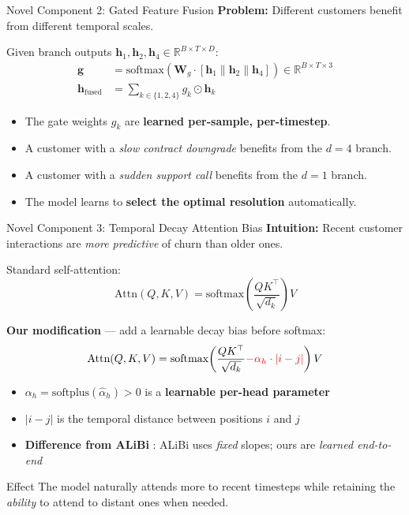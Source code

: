 \documentclass[aspectratio=169,11pt]{beamer}
\begin{document}
\begin{frame}{Novel Component 2: Gated Feature Fusion}
\textbf{Problem:} Different customers benefit from different temporal scales.
\vspace{6pt}

Given branch outputs $\mathbf{h}_1, \mathbf{h}_2, \mathbf{h}_4 \in \mathbb{R}^{B \times T \times D}$:
\vspace{4pt}
\begin{align}
    \mathbf{g} &= \text{softmax}\!\left(\mathbf{W}_g \cdot [\mathbf{h}_1 \| \mathbf{h}_2 \| \mathbf{h}_4]\right) \in \mathbb{R}^{B \times T \times 3} \\[4pt]
    \mathbf{h}_{\text{fused}} &= \sum_{k \in \{1,2,4\}} g_k \odot \mathbf{h}_k
\end{align}
\vspace{4pt}
\begin{itemize}
    \item The gate weights $g_k$ are \textbf{learned per-sample, per-timestep}.
    \item A customer with a \textit{slow contract downgrade} benefits from the $d{=}4$ branch.
    \item A customer with a \textit{sudden support call} benefits from the $d{=}1$ branch.
    \item The model learns to \textbf{select the optimal resolution} automatically.
\end{itemize}
\end{frame}

\begin{frame}{Novel Component 3: Temporal Decay Attention Bias}
\textbf{Intuition:} Recent customer interactions are \emph{more predictive} of churn than older ones.
\vspace{6pt}

Standard self-attention:
\[
\text{Attn}(Q, K, V) = \text{softmax}\!\left(\frac{QK^\top}{\sqrt{d_k}}\right) V
\]

\textbf{Our modification} — add a learnable decay bias before softmax:
\[
\text{Attn}(Q, K, V) = \text{softmax}\!\left(\frac{QK^\top}{\sqrt{d_k}} \textcolor{red}{- \alpha_h \cdot |i - j|}\right) V
\]
\vspace{2pt}
\begin{itemize}
    \item $\alpha_h = \text{softplus}(\hat{\alpha}_h) > 0$ is a \textbf{learnable per-head parameter}
    \item $|i - j|$ is the temporal distance between positions $i$ and $j$
    \item \textbf{Difference from ALiBi} \cite{press2022}: ALiBi uses \emph{fixed} slopes; ours are \emph{learned end-to-end}
\end{itemize}
\vspace{4pt}
\begin{block}{Effect}
The model naturally attends more to recent timesteps while retaining the \emph{ability} to attend to distant ones when needed.
\end{block}
\end{frame}
\end{document}
